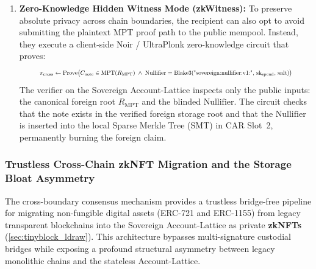 \documentclass[a4paper,11pt,twoside,parskip=half-,headings=small]{scrartcl}
\begin{document}
\begin{enumerate}[nosep]
  This brings an immense architectural advantage: \textbf{zero foreign VM is required}. The transparent asset on Ethereum or Base is instantly converted into a native private instrument on the Sovereign Account-Lattice. The recipient can immediately engage in confidential coordination, such as multilateral cyclic debt netting (\cref{sec:netting_engine}), private commercial bank money transfers, or shielded governance proposals, with zero link back to their transparent legacy address!

  \item \textbf{Zero-Knowledge Hidden Witness Mode (zkWitness):}
  To preserve absolute privacy across chain boundaries, the recipient can also opt to avoid submitting the plaintext MPT proof path to the public mempool. Instead, they execute a client-side Noir / UltraPlonk zero-knowledge circuit that proves:
  \begin{equation}
    \resizebox{0.86\linewidth}{!}{$\pi_{\text{cross}} \leftarrow \operatorname{Prove}\bigl(C_{\text{note}} \in \operatorname{MPT}(R_{\text{MPT}}) \;\land\; \operatorname{Nullifier} = \operatorname{Blake3}(\text{"sovereign:nullifier:v1:"},\, \text{sk}_{\text{spend}},\, \text{salt})\bigr)$}
    \label{eq:zk_cross_witness}
  \end{equation}
  The verifier on the Sovereign Account-Lattice inspects only the public inputs: the canonical foreign root $R_{\text{MPT}}$ and the blinded $\text{Nullifier}$. The circuit checks that the note exists in the verified foreign storage root and that the $\text{Nullifier}$ is inserted into the local Sparse Merkle Tree (SMT) in CAR Slot~2, permanently burning the foreign claim.
\end{enumerate}

\clearpage
\subsubsection{Trustless Cross-Chain zkNFT Migration and the Storage Bloat Asymmetry}
\label{sec:zknft_cross_migration}

The cross-boundary consensus mechanism provides a trustless bridge-free pipeline for migrating non-fungible digital assets (ERC-721 and ERC-1155) from legacy transparent blockchains into the Sovereign Account-Lattice as private \textbf{zkNFTs} (\cref{sec:tinyblock_ldraw}). This architecture bypasses multi-signature custodial bridges while exposing a profound structural asymmetry between legacy monolithic chains and the stateless Account-Lattice.
\end{document}
